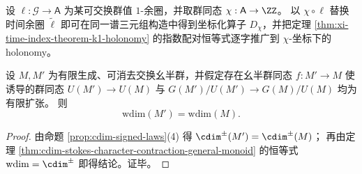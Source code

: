 \begin{corollary}[中心扩张读出的坐标化指数配对]\label{cor:discussion-character-index-holonomy}
设 \(\ell:\mathcal G\to \mathsf A\) 为某可交换群值 \(1\)-余圈，并取群同态 \(\chi:\mathsf A\to\ZZ\)。
以 \(\chi\circ \ell\) 替换时间余圈 \(\widetilde\ell\) 即可在同一谱三元组构造中得到坐标化算子 \(D_\chi\)，并把定理 \ref{thm:xi-time-index-theorem-k1-holonomy} 的指数配对恒等式逐字推广到 \(\chi\)-坐标下的 holonomy。
\end{corollary}

\begin{corollary}\label{cor:discussion-wdim-finite-index-stability}
设 \(M,M'\) 为有限生成、可消去交换幺半群，并假定存在幺半群同态 \(f:M'\to M\) 使诱导的群同态
\(
U(M')\to U(M)
\)
与
\(
G(M')/U(M')\to G(M)/U(M)
\)
均为有限扩张。
则
\[
\mathrm{wdim}(M')=\mathrm{wdim}(M).
\]
\end{corollary}
\begin{proof}
由命题 \ref{prop:cdim-signed-laws}(4) 得 \(\cdim^{\pm}(M')=\cdim^{\pm}(M)\)；
再由定理 \ref{thm:cdim-stokes-character-contraction-general-monoid} 的恒等式 \(\mathrm{wdim}=\cdim^{\pm}\) 即得结论。证毕。
\end{proof}

\endinput
